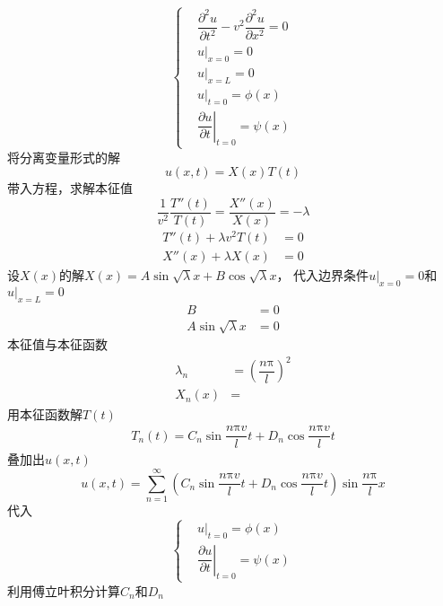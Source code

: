 \documentclass{article}
\begin{document}
\begin{equation*}
  \left\{
  \begin{aligned}
    & \dfrac{\partial^{2} u}{\partial t^{2}} - v^{2} \dfrac{\partial^{2} u}{\partial x^{2}} = 0 \\
    & u |_{x=0} = 0\\
    & u |_{x=L} = 0\\
    & u |_{t=0} = \phi (x)\\
    & \!\!\left. \dfrac{\partial u}{\partial t} \right|_{t=0} = \psi (x)
  \end{aligned}
  \right.
\end{equation*}
将分离变量形式的解
\begin{equation*}
  u(x,t) = X(x) T(t)
\end{equation*}
带入方程，求解本征值
\begin{equation*}
  \dfrac{1}{v^{2}} \dfrac{T''(t)}{T(t)} = \dfrac{X''(x)}{X(x)} = -\lambda
\end{equation*}
\begin{equation*}
  \begin{aligned}
    T''(t) + \lambda v^{2} T(t) &= 0\\
    X''(x) + \lambda X(x) &= 0
  \end{aligned}
\end{equation*}
设$X(x)$的解$X(x) = A \sin \sqrt{\lambda} x + B \cos \sqrt{\lambda}x$，
代入边界条件$u|_{x=0}=0$和$u|_{x=L} = 0$
\begin{equation*}
  \begin{aligned}
    B &= 0\\
    A \sin \sqrt{\lambda}x &= 0
  \end{aligned}
\end{equation*}
本征值与本征函数
\begin{equation*}
  \begin{aligned}
    \lambda_{n} &= \left( \dfrac{n \mathrm{\pi}}{l}  \right)^{2}\\
    X_{n}(x) &=
  \end{aligned}
\end{equation*}
用本征函数解$T(t)$
\begin{equation*}
  \begin{aligned}
    T_{n}(t) = C_{n} \sin \dfrac{n \mathrm{\pi} v}{l}t + D_{n} \cos \dfrac{n \mathrm{\pi} v}{l}t
  \end{aligned}
\end{equation*}
叠加出$u(x,t)$
\begin{equation*}
  u(x,t) = \sum_{n=1}^{\infty} \left( C_{n} \sin \dfrac{n \mathrm{\pi} v}{l}t + D_{n} \cos \dfrac{n \mathrm{\pi} v}{l}t \right)  \sin \dfrac{n \mathrm{\pi}}{l}x 
\end{equation*}
代入
\begin{equation*}
  \left\{
  \begin{aligned}
    & u |_{t=0} = \phi (x)\\
    & \!\!\left. \dfrac{\partial u}{\partial t} \right|_{t=0} = \psi (x)
  \end{aligned}
  \right.
\end{equation*}
利用傅立叶积分计算$C_{n}$和$D_{n}$
\end{document}
